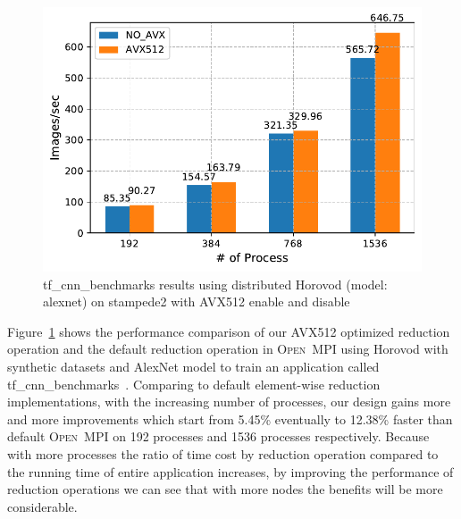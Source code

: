\documentclass[sigconf]{acmart}
\newcommand{\ompi}[0]{\textsc{Open~MPI}\xspace}
\begin{document}
\begin{figure}[h]
    \centering
    \includegraphics[width=\linewidth]{horovod_tacc.pdf}
    \caption{tf\_cnn\_benchmarks results using distributed Horovod (model: alexnet) on stampede2 with AVX512 enable and disable}
    \label{fig:horovod_tacc}
\end{figure}
Figure~\ref{fig:horovod_tacc} shows the performance comparison of
our AVX512 optimized reduction operation and the default reduction operation in \ompi
using Horovod with synthetic datasets and AlexNet model to train an application called
tf\_cnn\_benchmarks~\cite{cnn_Tensorflow}.
Comparing to default element-wise reduction
implementations, with the increasing number of processes,
our design gains more and more improvements which start from 5.45\% eventually to 12.38\% faster than default \ompi on 192 processes and 1536 processes respectively.
Because with more processes the ratio of time cost by reduction operation compared to the running time of entire application increases, by improving the performance of reduction operations we can see that with more nodes the benefits will be more considerable.

\end{document}
